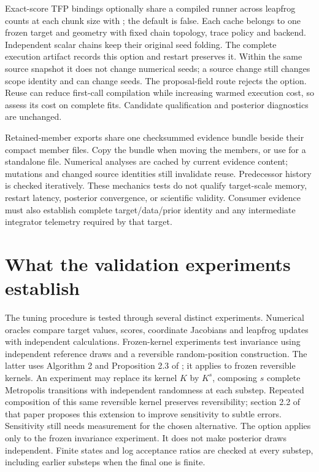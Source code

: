 Exact-score TFP bindings optionally share a compiled runner across leapfrog
counts at each chunk size with
; the default is false.
Each cache belongs to one frozen target and geometry with fixed chain topology,
trace policy and backend. Independent scalar chains keep their original seed
folding. The complete execution artifact records this option and restart
preserves it. Within the same source snapshot it does not change numerical
seeds; a source change still changes scope identity and can change seeds.
The proposal-field route rejects the option. Reuse can reduce first-call
compilation while increasing warmed execution cost, so assess its cost on
complete fits. Candidate qualification and posterior diagnostics are unchanged.

Retained-member exports share one checksummed evidence bundle beside their
compact member files. Copy the bundle when moving the members, or use
 for a standalone file. Numerical
analyses are cached by current evidence content; mutations and changed source
identities still invalidate reuse. Predecessor history is checked iteratively. These mechanics tests do not qualify target-scale memory, restart
latency, posterior convergence, or scientific validity. Consumer evidence must
also establish complete target/data/prior identity and any intermediate
integrator telemetry required by that target.




\section{What the validation experiments establish}
\label{sec:bf-inference-validation}

The tuning procedure is tested through several distinct experiments. Numerical
oracles compare target values, scores, coordinate Jacobians and leapfrog updates
with independent calculations. Frozen-kernel experiments test invariance using
independent reference draws and a reversible random-position construction.
The latter uses Algorithm 2 and Proposition 2.3 of
\citet{gandy2021mcmctesting}; it applies to frozen reversible kernels.
An experiment may replace its kernel $K$ by $K^s$, composing $s$ complete
Metropolis transitions with independent randomness at each substep. Repeated
composition of this same reversible kernel preserves reversibility; section 2.2
of that paper proposes this extension to improve sensitivity to subtle errors.
Sensitivity still needs measurement for the chosen alternative. The option
 applies only to the frozen invariance experiment. It does
not make posterior draws independent. Finite states and log acceptance ratios are checked at every
substep, including earlier substeps when the final one is finite.

